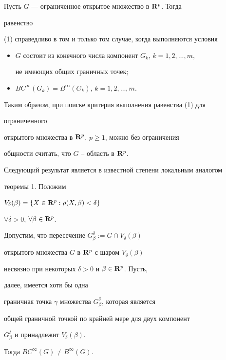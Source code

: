 \begin{cornonum}


Пусть $G$ --- ограниченное открытое множество в ${\bold R}^p$. Тогда


равенство


(1) справедливо в том и только том случае, когда выполняются условия


\begin{itemize}


\item[1)] $G$ состоит из конечного числа компонент $G_k$, $k=1,2,\dotsc,m$,


не имеющих общих граничных точек;


\item[2)] $BC^{\infty}(G_k)=B^{\infty}(G_k)$, $k=1,2,\dotsc, m$.


\end{itemize}


\end{cornonum}








Таким образом, при поиске критерия выполнения равенства (1) для


ограниченного


открытого множества в ${\bold R}^p$, $p\geqslant 1$, можно без ограничения


общности считать, что $G$ -- область в ${\bold R}^p$.





Следующий результат является в известной степени локальным аналогом


теоремы 1. Положим 


$V_{\delta}(\beta)=\{X\in {\bold R}^p:\rho(X,\beta)<\delta\}$


$\forall \delta >0$, $\forall \beta\in{\bold R}^p$.








\begin{thm}


Допустим, что пересечение $G^{\delta}_{\beta}:=G\cap V_{\delta}(\beta)$


открытого множества $G$ в ${\bold R}^p$ с шаром $V_{\delta}(\beta)$ 


несвязно при некоторых $\delta>0$ и $\beta \in {\bold R}^p$. Пусть, 


далее, имеется хотя бы одна


граничная точка $\gamma$ множества $G^{\delta}_{\beta}$, которая является


общей граничной точкой по крайней мере для двух компонент


$G^{\delta}_{\beta}$ и принадлежит $V_{\delta}(\beta)$.


Тогда $BC^{\infty}(G)\neq B^{\infty}(G)$.


\end{thm}








